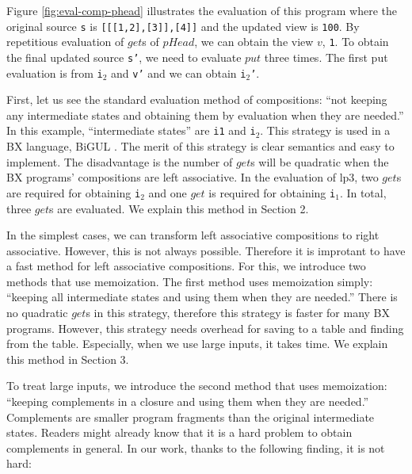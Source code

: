 
Figure \ref{fig:eval-comp-phead} illustrates the evaluation of this program where the original source \texttt{s} is \texttt{[[[1,2],[3]],[4]]} and the updated view is \texttt{100}.
By repetitious evaluation of $get$s of $pHead$, we can obtain the view $v$, \texttt{1}. To obtain the final updated source \texttt{s'}, we need to evaluate $put$ three times. The first put evaluation is from \texttt{i$_2$} and \texttt{v'} and we can obtain \texttt{i$_2$'}.

First, let us see the standard evaluation method of compositions: ``not keeping any intermediate states and obtaining them by evaluation when they are needed.'' In this example, ``intermediate states'' are \texttt{i1} and \texttt{i$_2$}. This strategy is used in a BX language, BiGUL \cite{}. The merit of this strategy is clear semantics and easy to implement. The disadvantage is the number of $get$s will be quadratic when the BX programs' compositions are left associative. In the evaluation of lp3, two $get$s are required for obtaining \texttt{i$_2$} and one $get$ is required for obtaining \texttt{i$_1$}. In total, three $get$s are evaluated. We explain this method in Section 2.

In the simplest cases, we can transform left associative compositions to right associative. However, this is not always possible. Therefore it is improtant to have a fast method for left associative compositions.
For this, we introduce two methods that use memoization.
The first method uses memoization simply: ``keeping all intermediate states and using them when they are needed.'' There is no quadratic $get$s in this strategy, therefore this strategy is faster for many BX programs. However, this strategy needs overhead for saving to a table and finding from the table. Especially, when we use large inputs, it takes time. We explain this method in Section 3.

To treat large inputs, we introduce the second method that uses memoization: ``keeping complements in a closure and using them when they are needed.'' Complements are smaller program fragments than the original intermediate states.
Readers might already know that it is a hard problem to obtain complements \cite{} in general. In our work, thanks to the following finding, it is not hard:


